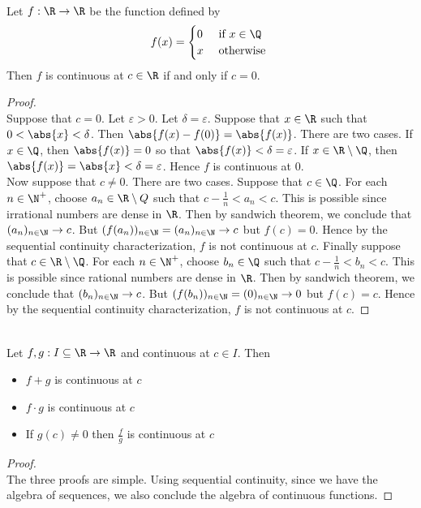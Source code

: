 \documentclass[a4paper]{article}
\begin{document}
\begin{eg}{}{}\\
Let $f:\R\to\R$ be the function defined by $$f(x)=\begin{cases}
0 & \text{ if }x\in\Q\\
x & \text{ otherwise }
\end{cases}$$
Then $f$ is continuous at $c\in\R$ if and only if $c=0$. 
\begin{proof}\\
Suppose that $c=0$. Let $\varepsilon>0$. Let $\delta=\varepsilon$. Suppose that $x\in\R$ such that $0<\abs{x}<\delta$. Then $\abs{f(x)-f(0)}=\abs{f(x)}$. There are two cases. If $x\in\Q$, then $\abs{f(x)}=0$ so that $\abs{f(x)}<\delta=\varepsilon$. If $x\in\R\setminus\Q$, then $\abs{f(x)}=\abs{x}<\delta=\varepsilon$. Hence $f$ is continuous at $0$. \\

Now suppose that $c\neq 0$. There are two cases. Suppose that $c\in\Q$. For each $n\in\N^+$, choose $a_n\in\R\setminus Q$ such that $c-\frac{1}{n}<a_n<c$. This is possible since irrational numbers are dense in $\R$. Then by sandwich theorem, we conclude that $(a_n)_{n\in\N}\to c$. But $(f(a_n))_{n\in\N}=(a_n)_{n\in\N}\to c$ but $f(c)=0$. Hence by the sequential continuity characterization, $f$ is not continuous at $c$. Finally suppose that $c\in\R\setminus\Q$. For each $n\in\N^+$, choose $b_n\in\Q$ such that $c-\frac{1}{n}<b_n<c$. This is possible since rational numbers are dense in $\R$. Then by sandwich theorem, we conclude that $(b_n)_{n\in\N}\to c$. But $(f(b_n))_{n\in\N}=(0)_{n\in\N}\to 0$ but $f(c)=c$. Hence by the sequential continuity characterization, $f$ is not continuous at $c$. 
\end{proof}
\end{eg}

\begin{prp}{}{}\\ Let $f,g:I\subseteq\R\to\R$ and continuous at $c\in I$. Then
\begin{itemize}
\item $f+g$ is continuous at $c$
\item $f\cdot g$ is continuous at $c$
\item If $g(c)\neq0$ then $\frac{f}{g}$ is continuous at $c$
\end{itemize}
\begin{proof}\\ The three proofs are simple. Using sequential continuity, since we have the algebra of sequences, we also conclude the algebra of continuous functions. 
\end{proof}
\end{prp}
\end{document}
